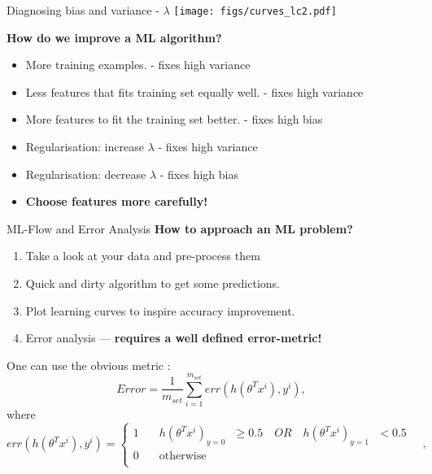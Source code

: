 \documentclass[usenames,dvipsnames]{beamer}
\begin{document}
\begin{frame}{Diagnosing bias and variance - $\lambda$}
\centering
    \texttt{[image: figs/curves\_lc2.pdf]} 
\end{frame}



\begin{frame}
\centering
{\bf How do we improve a ML algorithm?} 
\begin{itemize}
\item 
More training examples. -{\color{green} fixes high variance } \pause
\item 
Less features that fits training set equally well. -{\color{green} fixes high variance } \pause
\item 
More features to fit the training set better. -{\color{green} fixes high bias } \pause
\item 
Regularisation:  increase $\lambda$ -{\color{green} fixes high variance } \pause
\item
Regularisation:  decrease $\lambda$ -{\color{green} fixes high bias } \pause
\item
{\bf Choose features more carefully!   }
\end{itemize}
\end{frame}


\begin{frame}{ML-Flow and Error Analysis}
{\bf \large How to approach an ML problem?}


\begin{enumerate}
\item Take a look at your data and pre-process them
\item
Quick and dirty algorithm to get some predictions. 
\item 
Plot learning curves to inspire  accuracy improvement.
\item
Error analysis --- {\bf requires a well defined error-metric! }
\end{enumerate}
 One can use the obvious metric :
 \begin{equation}
 Error = \frac{1}{m_{set}} \sum_{i=1}^{m_{set}} err(h(\theta^T x^i), y^i),
 \end{equation}
 where 
  \[   
err(h(\theta^T x^i), y^i) = 
     \begin{cases}
       1 &\quad\text{$h({ \theta^T x^i})_{y=0}$ } \ge 0.5  \quad  OR \quad   \text{$h({ \theta^T x^i})_{y=1}$ }  < 0.5  \\
       0 &\quad\text{otherwise}\\
     \end{cases} \quad ,
\]
\end{frame}
\end{document}
